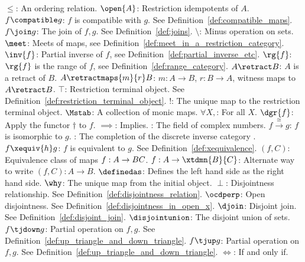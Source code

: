 \begin{tabbing}
\addsymbol \mbox{$\le$}: {An ordering relation.}
\addsymbol \mbox{$\open{A}$}: {Restriction idempotents of $A$.}
\addsymbol \mbox{$f\compatible g$}: {$f$ is compatible with $g$. See  Definition~\ref{def:compatible_maps}.}
\addsymbol \mbox{$f\join g$}: {The join of $f,g$. See Definition~\ref{def:joins}.}
\addsymbol \mbox{$\setminus$}: {Minus operation on sets.}
\addsymbol \mbox{$\meet$}: {Meets of maps, see Definition~\ref{def:meet_in_a_restriction_category}.}
\addsymbol \mbox{$\inv{f}$}: {Partial inverse of $f$, see Definition~\ref{def:partial_inverse_etc}.}
\addsymbol \mbox{$\rg{f}$}: {$\rg{f}$ is the range of $f$, see Definition~\ref{def:range_category}.}
\addsymbol \mbox{$A\retract B$}: {$A$ is a retract of $B$.}
\addsymbol \mbox{$A\retractmaps{m}{r} B$}: {$m:A\to B$, $r:B\to A$, witness maps to $A\retract B$.}
\addsymbol \mbox{$\top$}: {Restriction terminal object. See  Definition~\ref{def:restriction_terminal_object}.}
\addsymbol \mbox{$!$}: {The unique map to the restriction terminal object.}
\addsymbol \mbox{$\Mstab$}: {A collection of monic maps.}
\addsymbol \mbox{$\forall X,$}: {For all $X$.}
\addsymbol \mbox{$\dgr{f}$}: {Apply the functor $\dagger$ to $f$.}
\addsymbol \mbox{$\implies$}: {Implies.}
\addsymbol \mbox{\complex}: {The field of complex numbers.}
\addsymbol \mbox{$f\xrightarrow{\cong}g$}: {$f$ is isomorphic to $g$.}
\addsymbol \mbox{\Xt}: {The completion of the discrete inverse category \X.}
\addsymbol \mbox{$f\xequiv{h}g$}: {$f$ is equivalent to $g$. See  Definition~\ref{def:xequivalence}.}
\addsymbol \mbox{$(f,C)$}: {Equivalence class of maps $f:A\to B\*C$.}
\addsymbol \mbox{$f:A\to\xtdmn{B}{C}$}: {Alternate way to write $(f,C):A \to B$.}
\addsymbol \mbox{$\definedas$}: {Defines the left hand side as the right hand side.}
\addsymbol \mbox{$\why$}: {The unique map from the initial object.}
\addsymbol \mbox{$\perp$}: {Disjointness relationship. See  Definition~\ref{def:disjointness_relation}.}
\addsymbol \mbox{$\ocdperp$}: {Open disjointness. See Definition~\ref{def:disjointness_in_open_x}.}
\addsymbol \mbox{$\djoin$}: {Disjoint join. See Definition~\ref{def:disjoint_join}.}
\addsymbol \mbox{$\disjointunion$}: {The disjoint union of sets.}
\addsymbol \mbox{$f\tjdown g$}: {Partial operation on $f,g$. See Definition~\ref{def:up_triangle_and_down_triangle}.}
\addsymbol \mbox{$f\tjup g$}: {Partial operation on $f,g$. See Definition~\ref{def:up_triangle_and_down_triangle}.}
\addsymbol \mbox{$\iff$}: {If and only if.}
\end{tabbing}

